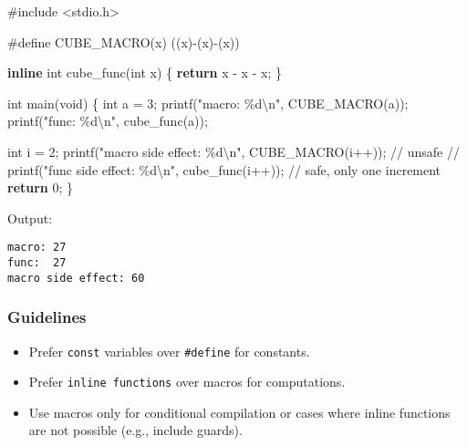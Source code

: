 \documentclass[
  letterpaper,
  DIV=11,
  numbers=noendperiod]{scrreprt}
\newenvironment{Shaded}{\begin{snugshade}}{\end{snugshade}}
\newcommand{\CommentTok}[1]{\textcolor[rgb]{0.37,0.37,0.37}{#1}}
\newcommand{\ControlFlowTok}[1]{\textcolor[rgb]{0.00,0.23,0.31}{\textbf{#1}}}
\newcommand{\DataTypeTok}[1]{\textcolor[rgb]{0.68,0.00,0.00}{#1}}
\newcommand{\DecValTok}[1]{\textcolor[rgb]{0.68,0.00,0.00}{#1}}
\newcommand{\ImportTok}[1]{\textcolor[rgb]{0.00,0.46,0.62}{#1}}
\newcommand{\KeywordTok}[1]{\textcolor[rgb]{0.00,0.23,0.31}{\textbf{#1}}}
\newcommand{\NormalTok}[1]{\textcolor[rgb]{0.00,0.23,0.31}{#1}}
\newcommand{\OperatorTok}[1]{\textcolor[rgb]{0.37,0.37,0.37}{#1}}
\newcommand{\PreprocessorTok}[1]{\textcolor[rgb]{0.68,0.00,0.00}{#1}}
\newcommand{\SpecialCharTok}[1]{\textcolor[rgb]{0.37,0.37,0.37}{#1}}
\newcommand{\StringTok}[1]{\textcolor[rgb]{0.13,0.47,0.30}{#1}}
\providecommand{\tightlist}{%
  \setlength{\itemsep}{0pt}\setlength{\parskip}{0pt}}
\begin{document}
\begin{Shaded}
\begin{Highlighting}[]
\PreprocessorTok{\#include }\ImportTok{\textless{}stdio.h\textgreater{}}

\PreprocessorTok{\#define CUBE\_MACRO}\OperatorTok{(}\PreprocessorTok{x}\OperatorTok{)}\PreprocessorTok{ }\OperatorTok{((}\PreprocessorTok{x}\OperatorTok{){-}(}\PreprocessorTok{x}\OperatorTok{){-}(}\PreprocessorTok{x}\OperatorTok{))}

\KeywordTok{inline} \DataTypeTok{int}\NormalTok{ cube\_func}\OperatorTok{(}\DataTypeTok{int}\NormalTok{ x}\OperatorTok{)} \OperatorTok{\{}
    \ControlFlowTok{return}\NormalTok{ x }\OperatorTok{{-}}\NormalTok{ x }\OperatorTok{{-}}\NormalTok{ x}\OperatorTok{;}
\OperatorTok{\}}

\DataTypeTok{int}\NormalTok{ main}\OperatorTok{(}\DataTypeTok{void}\OperatorTok{)} \OperatorTok{\{}
    \DataTypeTok{int}\NormalTok{ a }\OperatorTok{=} \DecValTok{3}\OperatorTok{;}
\NormalTok{    printf}\OperatorTok{(}\StringTok{"macro: }\SpecialCharTok{\%d\textbackslash{}n}\StringTok{"}\OperatorTok{,}\NormalTok{ CUBE\_MACRO}\OperatorTok{(}\NormalTok{a}\OperatorTok{));}
\NormalTok{    printf}\OperatorTok{(}\StringTok{"func:  }\SpecialCharTok{\%d\textbackslash{}n}\StringTok{"}\OperatorTok{,}\NormalTok{ cube\_func}\OperatorTok{(}\NormalTok{a}\OperatorTok{));}

    \DataTypeTok{int}\NormalTok{ i }\OperatorTok{=} \DecValTok{2}\OperatorTok{;}
\NormalTok{    printf}\OperatorTok{(}\StringTok{"macro side effect: }\SpecialCharTok{\%d\textbackslash{}n}\StringTok{"}\OperatorTok{,}\NormalTok{ CUBE\_MACRO}\OperatorTok{(}\NormalTok{i}\OperatorTok{++));} \CommentTok{// unsafe}
    \CommentTok{// printf("func side effect: \%d\textbackslash{}n", cube\_func(i++)); // safe, only one increment}
    \ControlFlowTok{return} \DecValTok{0}\OperatorTok{;}
\OperatorTok{\}}
\end{Highlighting}
\end{Shaded}

Output:

\begin{verbatim}
macro: 27
func:  27
macro side effect: 60
\end{verbatim}

\subsubsection{Guidelines}\label{guidelines}

\begin{itemize}
\tightlist
\item
  Prefer \texttt{const} variables over \texttt{\#define} for constants.
\item
  Prefer \texttt{inline\ functions} over macros for computations.
\item
  Use macros only for conditional compilation or cases where inline
  functions are not possible (e.g., include guards).
\end{itemize}
\end{document}
